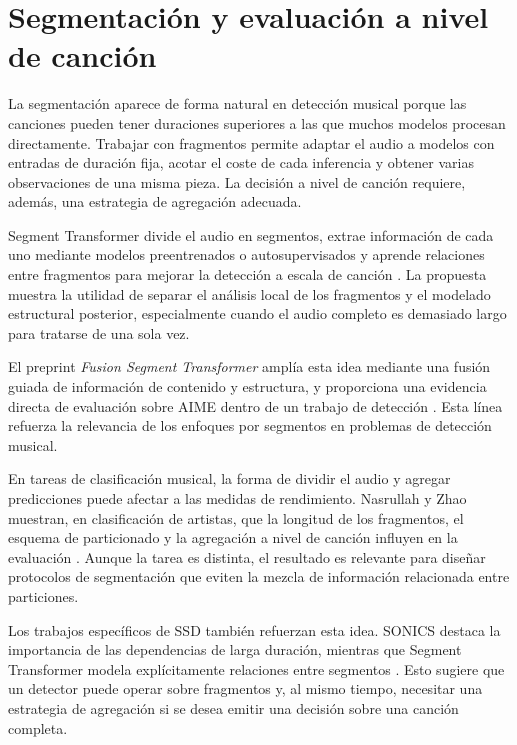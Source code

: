 \section{Segmentación y evaluación a nivel de canción}

La segmentación aparece de forma natural en detección musical porque las canciones pueden tener duraciones superiores a las que muchos modelos procesan directamente. Trabajar con fragmentos permite adaptar el audio a modelos con entradas de duración fija, acotar el coste de cada inferencia y obtener varias observaciones de una misma pieza. La decisión a nivel de canción requiere, además, una estrategia de agregación adecuada.

Segment Transformer divide el audio en segmentos, extrae información de cada uno mediante modelos preentrenados o autosupervisados y aprende relaciones entre fragmentos para mejorar la detección a escala de canción \cite{kim2025segmenttransformer}. La propuesta muestra la utilidad de separar el análisis local de los fragmentos y el modelado estructural posterior, especialmente cuando el audio completo es demasiado largo para tratarse de una sola vez.

El preprint \textit{Fusion Segment Transformer} amplía esta idea mediante una fusión guiada de información de contenido y estructura, y proporciona una evidencia directa de evaluación sobre AIME dentro de un trabajo de detección \cite{kim2026fusionsegmenttransformer}. Esta línea refuerza la relevancia de los enfoques por segmentos en problemas de detección musical.

En tareas de clasificación musical, la forma de dividir el audio y agregar predicciones puede afectar a las medidas de rendimiento. Nasrullah y Zhao muestran, en clasificación de artistas, que la longitud de los fragmentos, el esquema de particionado y la agregación a nivel de canción influyen en la evaluación \cite{nasrullah2019musicartistclassification}. Aunque la tarea es distinta, el resultado es relevante para diseñar protocolos de segmentación que eviten la mezcla de información relacionada entre particiones.

Los trabajos específicos de SSD también refuerzan esta idea. SONICS destaca la importancia de las dependencias de larga duración, mientras que Segment Transformer modela explícitamente relaciones entre segmentos \cite{rahman2024sonics,kim2025segmenttransformer}. Esto sugiere que un detector puede operar sobre fragmentos y, al mismo tiempo, necesitar una estrategia de agregación si se desea emitir una decisión sobre una canción completa.

